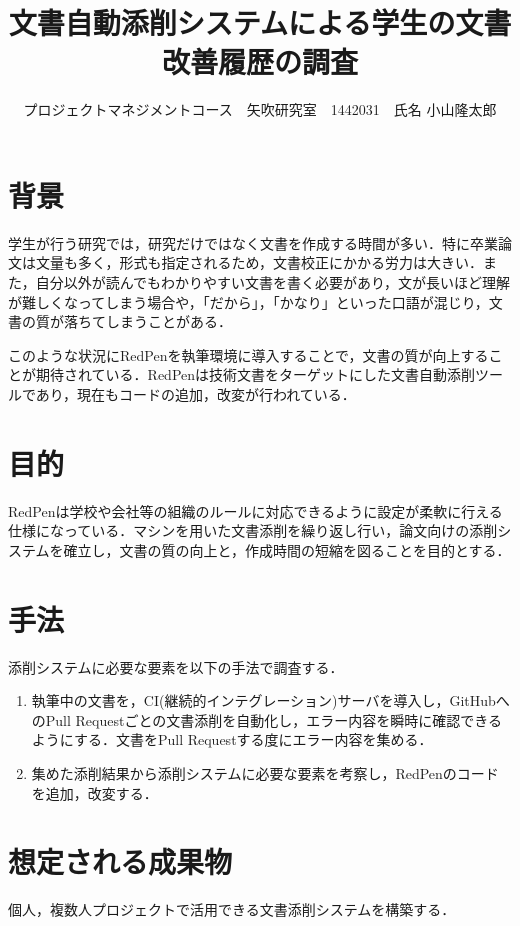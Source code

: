 \documentclass[uplatex,twocolumn,dvipdfmx]{jsarticle}
\title{\vspace{-5mm}\fontsize{14pt}{0pt}\selectfont 文書自動添削システムによる学生の文書改善履歴の調査}
\author{\normalsize プロジェクトマネジメントコース　矢吹研究室　1442031　氏名 小山隆太郎}
\date{}
\begin{document}
\fontsize{10.5pt}{\baselineskip}\selectfont
\maketitle





\section{背景}
学生が行う研究では，研究だけではなく文書を作成する時間が多い．特に卒業論文は文量も多く，形式も指定されるため，文書校正にかかる労力は大きい．また，自分以外が読んでもわかりやすい文書を書く必要があり，文が長いほど理解が難しくなってしまう場合や，「だから」，「かなり」といった口語が混じり，文書の質が落ちてしまうことがある．

このような状況にRedPen\cite{a}を執筆環境に導入することで，文書の質が向上することが期待されている．RedPenは技術文書をターゲットにした文書自動添削ツールであり，現在もコードの追加，改変が行われている\cite{b}．

\section{目的}
RedPenは学校や会社等の組織のルールに対応できるように設定が柔軟に行える仕様になっている．マシンを用いた文書添削を繰り返し行い，論文向けの添削システムを確立し，文書の質の向上と，作成時間の短縮を図ることを目的とする．

\section{手法}
添削システムに必要な要素を以下の手法で調査する．

\begin{enumerate}
 \item 執筆中の文書を，CI(継続的インテグレーション)サーバを導入し，GitHubへのPull Requestごとの文書添削を自動化し，エラー内容を瞬時に確認できるようにする．文書をPull Requestする度にエラー内容を集める\cite{c}．
 \item 集めた添削結果から添削システムに必要な要素を考察し，RedPenのコードを追加，改変する．
\end{enumerate}

\section{想定される成果物}
個人，複数人プロジェクトで活用できる文書添削システムを構築する．
\end{document}
